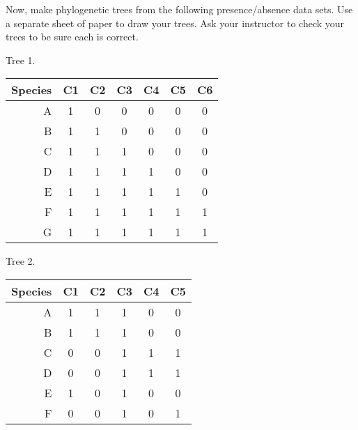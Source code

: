 \documentclass[12pt, addpoints]{exam}
\begin{document}
{\newpage

\thispagestyle{empty}

\begin{questions}

\begin{landscape}



Now, make phylogenetic trees from the following presence/absence data sets. Use a separate sheet of paper to draw your trees. Ask your instructor to check your trees to be sure each is correct. 



{
\liningnum

\begin{minipage}[t]{0.4\textwidth}

\vspace{\baselineskip}

\question

Tree 1.

\begin{longtable}[l]{@{}rcccccc@{}}
\toprule
Species & C1 & C2 & C3 & C4 & C5 & C6\tabularnewline
\midrule
A & 1 & 0 & 0 & 0 & 0 & 0\tabularnewline
B & 1 & 1 & 0 & 0 & 0 & 0\tabularnewline
C & 1 & 1 & 1 & 0 & 0 & 0\tabularnewline
D & 1 & 1 & 1 & 1 & 0 & 0\tabularnewline
E & 1 & 1 & 1 & 1 & 1 & 0\tabularnewline
F & 1 & 1 & 1 & 1 & 1 & 1\tabularnewline
G & 1 & 1 & 1 & 1 & 1 & 1\tabularnewline
\bottomrule
\end{longtable}

\end{minipage}\hspace*{2in}
\begin{minipage}[t]{0.4\textwidth}

\vspace{\baselineskip}
	
\question
Tree 2.
\begin{longtable}[l]{@{}rccccc@{}}
\toprule
Species & C1 & C2 & C3 & C4 & C5 \tabularnewline
\midrule
A & 1 & 1 & 1 & 0 & 0 \tabularnewline
B & 1 & 1 & 1 & 0 & 0 \tabularnewline
C & 0 & 0 & 1 & 1 & 1 \tabularnewline
D & 0 & 0 & 1 & 1 & 1 \tabularnewline
E & 1 & 0 & 1 & 0 & 0 \tabularnewline
F & 0 & 0 & 1 & 0 & 1 \tabularnewline
\bottomrule
\end{longtable}

\end{minipage}

}
\end{landscape}
\end{questions}}
\end{document}
